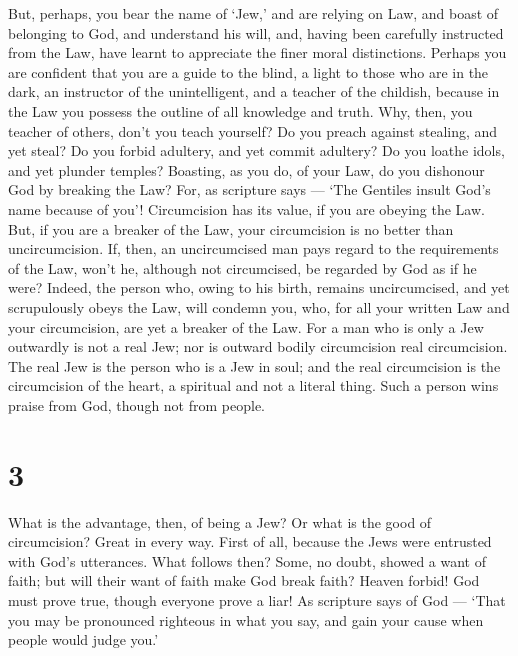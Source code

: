  But, perhaps, you bear the name of `Jew,' and are relying
on Law, and boast of belonging to God, and understand his will,
 and, having been carefully instructed from the Law, have
learnt to appreciate the finer moral distinctions.  Perhaps
you are confident that you are a guide to the blind, a light to those
who are in the dark, an instructor of the unintelligent, 
and a teacher of the childish, because in the Law you possess the
outline of all knowledge and truth.  Why, then, you teacher
of others, don't you teach yourself? Do you preach against stealing, and
yet steal?  Do you forbid adultery, and yet commit
adultery? Do you loathe idols, and yet plunder temples? 
Boasting, as you do, of your Law, do you dishonour God by breaking the
Law?  For, as scripture says --- `The Gentiles insult God's
name because of you'!  Circumcision has its value, if you
are obeying the Law. But, if you are a breaker of the Law, your
circumcision is no better than uncircumcision.  If, then,
an uncircumcised man pays regard to the requirements of the Law, won't
he, although not circumcised, be regarded by God as if he were?
 Indeed, the person who, owing to his birth, remains
uncircumcised, and yet scrupulously obeys the Law, will condemn you,
who, for all your written Law and your circumcision, are yet a breaker
of the Law.  For a man who is only a Jew outwardly is not a
real Jew; nor is outward bodily circumcision real circumcision. The real
Jew is the person who is a Jew in soul;  and the real
circumcision is the circumcision of the heart, a spiritual and not a
literal thing. Such a person wins praise from God, though not from
people.

\hypertarget{section-2}{%
\section{3}\label{section-2}}

 What is the advantage, then, of being a Jew? Or what is the
good of circumcision?  Great in every way. First of all,
because the Jews were entrusted with God's utterances.  What
follows then? Some, no doubt, showed a want of faith; but will their
want of faith make God break faith? Heaven forbid!  God must
prove true, though everyone prove a liar! As scripture says of God ---
`That you may be pronounced righteous in what you say, and gain your
cause when people would judge you.'


